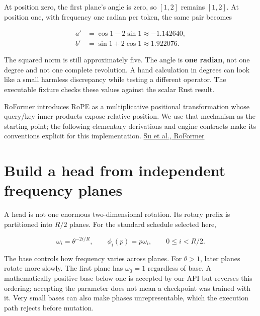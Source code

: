 At position zero, the first plane's angle is zero, so \([1,2]\) remains
\([1,2]\). At position one, with frequency one radian per token, the
same pair becomes

\begin{equation}
\begin{aligned}
a'&=\cos 1-2\sin 1\approx-1.142640,\\
b'&=\sin 1+2\cos 1\approx 1.922076.
\end{aligned}
\end{equation}

The squared norm is still approximately five. The angle is \textbf{one
radian}, not one degree and not one complete revolution. A hand
calculation in degrees can look like a small harmless discrepancy while
testing a different operator. The executable fixture checks these values
against the scalar Rust result.

RoFormer introduces RoPE as a multiplicative positional transformation
whose query/key inner products expose relative position. We use that
mechanism as the starting point; the following elementary derivations
and engine contracts make its conventions explicit for this
implementation. \href{https://arxiv.org/html/2104.09864v5}{Su et al.,
RoFormer}

\section{Build a head from independent frequency
planes}\label{build-a-head-from-independent-frequency-planes}


A head is not one enormous two-dimensional rotation. Its rotary prefix
is partitioned into \(R/2\) planes. For the standard schedule selected
here,

\begin{equation}
\omega_i=\theta^{-2i/R},\qquad
\phi_i(p)=p\omega_i,\qquad 0\le i<R/2.
\end{equation}

The base controls how frequency varies across planes. For \(\theta>1\),
later planes rotate more slowly. The first plane has \(\omega_0=1\)
regardless of base. A mathematically positive base below one is accepted
by our API but reverses this ordering; accepting the parameter does not
mean a checkpoint was trained with it. Very small bases can also make
phases unrepresentable, which the execution path rejects before
mutation.


